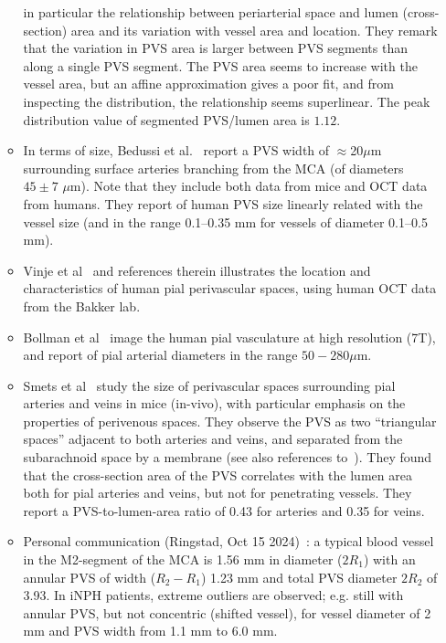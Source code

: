 \documentclass[fleqn,10pt]{wlscirep}
\begin{document}
\begin{enumerate}
\begin{itemize}
  in particular the relationship between periarterial space and lumen
  (cross-section) area and its variation with vessel area and
  location. They remark that the variation in PVS area is larger
  between PVS segments than along a single PVS segment. The PVS area
  seems to increase with the vessel area, but an affine approximation
  gives a poor fit, and from inspecting the distribution, the
  relationship seems superlinear. The peak distribution value of
  segmented PVS/lumen area is $1.12$.
  \item
    In terms of size, Bedussi et al.~\cite{bedussi2018paravascular} report a PVS width of $\approx$20$\mu$m surrounding surface arteries branching from the MCA (of diameters $45 \pm 7$ $\mu$m). Note that they include both data from mice and OCT data from humans. They report of human PVS size linearly related with the vessel size (and in the range 0.1--0.35 mm for vessels of diameter 0.1--0.5 mm).
  \item Vinje et al~\cite{vinje2021brain} and references therein illustrates the location and characteristics of human pial perivascular spaces, using human OCT data from the Bakker lab.
  \item Bollman et al~\cite{bollmann2022imaging} image the human pial vasculature at high resolution (7T), and report of pial arterial diameters in the range $50-280 \mu$m.
\item
  Smets et al~\cite{smets2024perivascular} study the size of
  perivascular spaces surrounding pial arteries and veins in mice
  (in-vivo), with particular emphasis on the properties of perivenous
  spaces. They observe the PVS as two ``triangular spaces'' adjacent
  to both arteries and veins, and separated from the subarachnoid
  space by a membrane (see also references
  to~\cite{zhang1990interrelationships, pizzo2018intrathecal,
    mollgard2023mesothelium}). They found that the cross-section area
  of the PVS correlates with the lumen area both for pial arteries
  and veins, but not for penetrating vessels. They report a
  PVS-to-lumen-area ratio of 0.43 for arteries and 0.35 for veins.
\item
  Personal communication (Ringstad, Oct 15 2024)~\cite{eide2024functional}: a typical blood vessel in the M2-segment of the MCA is 1.56 mm in diameter ($2 R_1$) with an annular PVS of width ($R_2 - R_1$) 1.23 mm and total PVS diameter $2 R_2$ of 3.93. In iNPH patients, extreme outliers are observed; e.g. still with annular PVS, but not concentric (shifted vessel), for vessel diameter of 2 mm and PVS width from 1.1 mm to 6.0 mm.

\end{itemize}
\end{enumerate}
\end{document}

